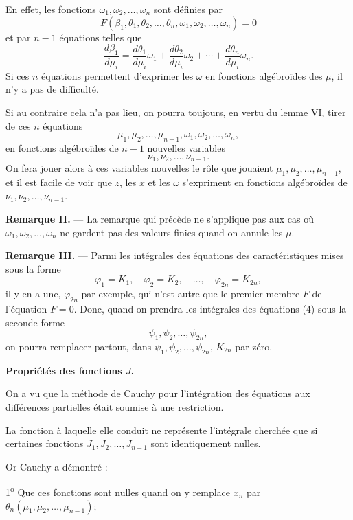 \documentclass[11pt]{article}
\begin{document}
En effet, les fonctions $\omega_1,\omega_2,\ldots,\omega_n$ sont définies par
\[
F(\beta_1,\theta_1,\theta_2,\ldots,\theta_n,\omega_1,\omega_2,\ldots,\omega_n)=0
\]
et par $n-1$ équations telles que
\[
\frac{d\beta_1}{d\mu_i}=\frac{d\theta_1}{d\mu_i}\omega_1+\frac{d\theta_2}{d\mu_i}\omega_2+\cdots+\frac{d\theta_n}{d\mu_i}\omega_n.
\]
Si ces $n$ équations permettent d'exprimer les $\omega$ en fonctions algébroïdes des $\mu$, il n'y a pas de difficulté.

Si au contraire cela n'a pas lieu, on pourra toujours, en vertu du lemme VI, tirer de ces $n$ équations
\[
\mu_1,\mu_2,\ldots,\mu_{n-1},\omega_1,\omega_2,\ldots,\omega_n,
\]
en fonctions algébroïdes de $n-1$ nouvelles variables
\[
\nu_1,\nu_2,\ldots,\nu_{n-1}.
\]
On fera jouer alors à ces variables nouvelles le rôle que jouaient $\mu_1,\mu_2,\ldots,\mu_{n-1}$, et il est facile de voir que $z$, les $x$ et les $\omega$ s'expriment en fonctions algébroïdes de $\nu_1,\nu_2,\ldots,\nu_{n-1}$.

\medskip
\noindent\textbf{Remarque II.} — La remarque qui précède ne s'applique pas aux cas où $\omega_1,\omega_2,\ldots,\omega_n$ ne gardent pas des valeurs finies quand on annule les $\mu$.

\medskip
\noindent\textbf{Remarque III.} — Parmi les intégrales des équations des caractéristiques mises sous la forme
\begin{equation*}\tag{5}
\varphi_1=K_1,
\quad \varphi_2=K_2,
\quad \ldots,
\quad \varphi_{2n}=K_{2n},
\end{equation*}
il y en a une, $\varphi_{2n}$ par exemple, qui n'est autre que le premier membre $F$ de l'équation $F=0$. Donc, quand on prendra les intégrales des équations (4) sous la seconde forme
\[
\psi_1,\psi_2,\ldots,\psi_{2n},
\]
on pourra remplacer partout, dans $\psi_1,\psi_2,\ldots,\psi_{2n}$, $K_{2n}$ par zéro.

\begin{center}
\textbf{Propriétés des fonctions $J$.}
\end{center}

On a vu que la méthode de Cauchy pour l'intégration des équations aux différences partielles était soumise à une restriction.

La fonction à laquelle elle conduit ne représente l'intégrale cherchée que si certaines fonctions $J_1,J_2,\ldots,J_{n-1}$ sont identiquement nulles.

Or Cauchy a démontré :

1\textsuperscript{o} Que ces fonctions sont nulles quand on y remplace $x_n$ par $\theta_n(\mu_1,\mu_2,\ldots,\mu_{n-1})$;
\end{document}
